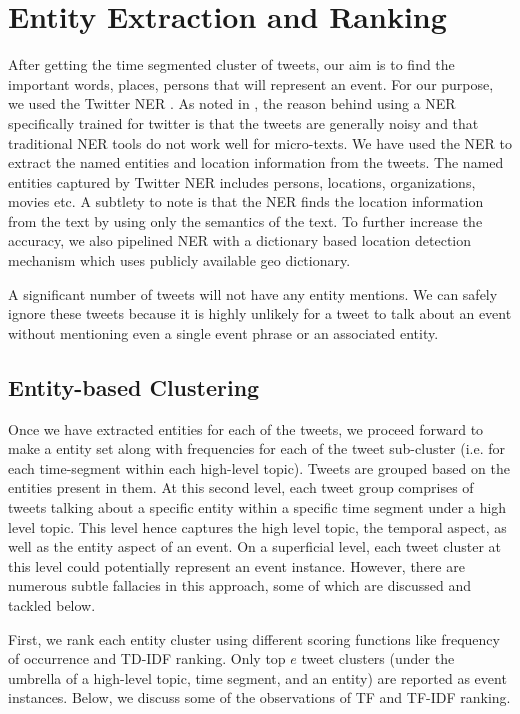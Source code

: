 \section{Entity Extraction and Ranking}
After getting the time segmented cluster of tweets, our aim is to find the important words, places, persons that will represent an event. For our purpose, we used the Twitter NER \cite{ritter2011named}. As noted in \cite{ritter2011named}, the reason behind using a NER specifically trained for twitter is that the tweets are generally noisy and that traditional NER tools do not work well for micro-texts. We have used the NER to extract the named entities and location information from the tweets. The named entities captured by Twitter NER includes persons, locations, organizations, movies etc. A subtlety to note is that the NER finds the location information from the text by using only the semantics of the text. To further increase the accuracy, we also pipelined NER with a dictionary based location detection mechanism which uses publicly available geo dictionary.

A significant number of tweets will not have any entity mentions. We can safely ignore these tweets because it is highly unlikely for a tweet to talk about an event without mentioning even a single event phrase or an associated entity.

\subsection{Entity-based Clustering}
Once we have extracted entities for each of the tweets, we proceed forward to make a entity set along with frequencies for each of the tweet sub-cluster (i.e. for each time-segment within each high-level topic). Tweets are grouped based on the entities present in them. At this second level, each tweet group comprises of tweets talking about a specific entity within a specific time segment under a high level topic. This level hence captures the high level topic, the temporal aspect, as well as the entity aspect of an event. On a superficial level, each tweet cluster at this level could potentially represent an event instance. However, there are numerous subtle fallacies in this approach, some of which are discussed and tackled below.

First, we rank each entity cluster using different scoring functions like frequency of occurrence and TD-IDF ranking. Only top $e$ tweet clusters (under the umbrella of a high-level topic, time segment, and an entity) are reported as event instances. Below, we discuss some of the observations of TF and TF-IDF ranking.

